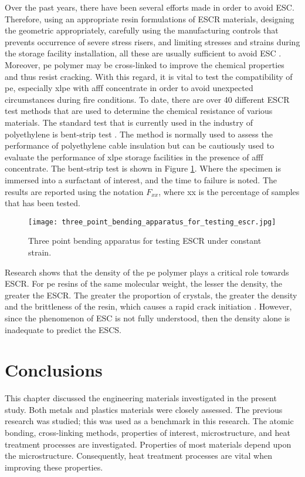 Over the past years, there have been several efforts made in order to avoid ESC. Therefore, using an appropriate resin formulations of ESCR materials, designing the geometric appropriately, carefully using the manufacturing controls that prevents occurrence of severe stress risers, and limiting stresses and strains during the storage facility installation, all these are usually sufficient to avoid ESC \cite{gabriel1998history}. Moreover, \acrshort{pe} polymer may be cross-linked to improve the chemical properties and thus resist cracking.  With this regard, it is vital to test the compatibility of \acrshort{pe}, especially \acrshort{xlpe} with \acrshort{afff} concentrate in order to avoid unexpected circumstances during fire conditions. To date, there are over 40 different ESCR test methods that are used to determine the chemical resistance of various materials. The standard test that is currently used in the industry of polyethylene is bent-strip test \cite{gabriel1998history}. The method is normally used to assess the performance of polyethylene cable insulation but can be cautiously used to evaluate the performance of \acrshort{xlpe} storage facilities in the presence of \acrshort{afff} concentrate. The bent-strip test is shown in Figure \ref{ch3:figure:bending_apparatus}. Where the specimen is immersed into a surfactant of interest, and the time to failure is noted. The results are reported using the notation $F_{xx}$, where xx is the percentage of samples that has been tested.
 
\begin{figure}[H]
    \centering
    \texttt{[image: three\_point\_bending\_apparatus\_for\_testing\_escr.jpg]}
    \caption{Three point bending apparatus for testing ESCR under constant strain. \cite{choi2009modeling}}
    \label{ch3:figure:bending_apparatus}
\end{figure}

Research shows that the density of the \acrshort{pe} polymer plays a critical role towards ESCR. For \acrshort{pe} resins of the same molecular weight, the lesser the density, the greater the ESCR. The greater the proportion of crystals, the greater the density and the brittleness of the resin, which causes a rapid crack initiation \cite{gabriel1998history}. However, since the phenomenon of ESC is not fully understood, then the density alone is inadequate to predict the ESCS. 

\section{Conclusions}
This chapter discussed the engineering materials investigated in the present study. Both metals and plastics materials were closely assessed. The previous research was studied; this was used as a benchmark in this research. The atomic bonding, cross-linking methods, properties of interest, microstructure, and heat treatment processes are investigated. Properties of most materials depend upon the microstructure. Consequently, heat treatment processes are vital when improving these properties.

